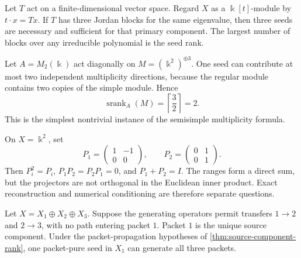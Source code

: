 \documentclass[11pt]{article}
\theoremstyle{definition}
\theoremstyle{remark}
\newcommand{\bbk}{\Bbbk}
\newcommand{\srank}{\operatorname{srank}}
\begin{document}
\begin{microexample}[title={R1: one operator with several primary blocks}]
Let \(T\) act on a finite-dimensional vector space.  Regard \(X\) as a \(\bbk[t]\)-module by \(t\cdot x=Tx\).  If \(T\) has three Jordan blocks for the same eigenvalue, then three seeds are necessary and sufficient for that primary component.  The largest number of blocks over any irreducible polynomial is the seed rank.
\end{microexample}

\begin{microexample}[title={R2: a matrix algebra with multiplicity}]
Let \(A=M_2(\bbk)\) act diagonally on \(M=(\bbk^2)^{\oplus3}\).  One seed can contribute at most two independent multiplicity directions, because the regular module contains two copies of the simple module.  Hence
\[
\srank_A(M)=\left\lceil\frac{3}{2}\right\rceil=2.
\]
This is the simplest nontrivial instance of the semisimple multiplicity formula.
\end{microexample}

\begin{microexample}[title={R3: an exact but oblique packet split}]
On \(X=\bbk^2\), set
\[
P_1=\begin{pmatrix}1&-1\\0&0\end{pmatrix},
\qquad
P_2=\begin{pmatrix}0&1\\0&1\end{pmatrix}.
\]
Then \(P_i^2=P_i\), \(P_1P_2=P_2P_1=0\), and \(P_1+P_2=I\).  The ranges form a direct sum, but the projectors are not orthogonal in the Euclidean inner product.  Exact reconstruction and numerical conditioning are therefore separate questions.
\end{microexample}

\begin{microexample}[title={R4: a directed packet system}]
Let \(X=X_1\oplus X_2\oplus X_3\).  Suppose the generating operators permit transfers \(1\to2\) and \(2\to3\), with no path entering packet \(1\).  Packet \(1\) is the unique source component.  Under the packet-propagation hypotheses of \cref{thm:source-component-rank}, one packet-pure seed in \(X_1\) can generate all three packets.
\end{microexample}
\end{document}

